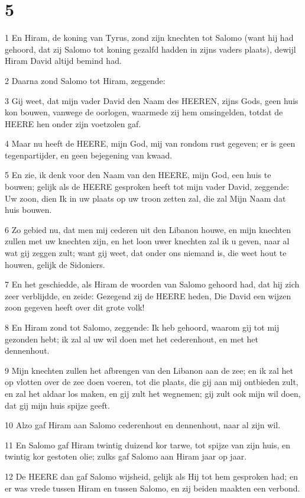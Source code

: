 \chapter{5}

\par 1 En Hiram, de koning van Tyrus, zond zijn knechten tot Salomo (want hij had gehoord, dat zij Salomo tot koning gezalfd hadden in zijns vaders plaats), dewijl Hiram David altijd bemind had.
\par 2 Daarna zond Salomo tot Hiram, zeggende:
\par 3 Gij weet, dat mijn vader David den Naam des HEEREN, zijns Gods, geen huis kon bouwen, vanwege de oorlogen, waarmede zij hem omsingelden, totdat de HEERE hen onder zijn voetzolen gaf.
\par 4 Maar nu heeft de HEERE, mijn God, mij van rondom rust gegeven; er is geen tegenpartijder, en geen bejegening van kwaad.
\par 5 En zie, ik denk voor den Naam van den HEERE, mijn God, een huis te bouwen; gelijk als de HEERE gesproken heeft tot mijn vader David, zeggende: Uw zoon, dien Ik in uw plaats op uw troon zetten zal, die zal Mijn Naam dat huis bouwen.
\par 6 Zo gebied nu, dat men mij cederen uit den Libanon houwe, en mijn knechten zullen met uw knechten zijn, en het loon uwer knechten zal ik u geven, naar al wat gij zeggen zult; want gij weet, dat onder ons niemand is, die weet hout te houwen, gelijk de Sidoniers.
\par 7 En het geschiedde, als Hiram de woorden van Salomo gehoord had, dat hij zich zeer verblijdde, en zeide: Gezegend zij de HEERE heden, Die David een wijzen zoon gegeven heeft over dit grote volk!
\par 8 En Hiram zond tot Salomo, zeggende: Ik heb gehoord, waarom gij tot mij gezonden hebt; ik zal al uw wil doen met het cederenhout, en met het dennenhout.
\par 9 Mijn knechten zullen het afbrengen van den Libanon aan de zee; en ik zal het op vlotten over de zee doen voeren, tot die plaats, die gij aan mij ontbieden zult, en zal het aldaar los maken, en gij zult het wegnemen; gij zult ook mijn wil doen, dat gij mijn huis spijze geeft.
\par 10 Alzo gaf Hiram aan Salomo cederenhout en dennenhout, naar al zijn wil.
\par 11 En Salomo gaf Hiram twintig duizend kor tarwe, tot spijze van zijn huis, en twintig kor gestoten olie; zulks gaf Salomo aan Hiram jaar op jaar.
\par 12 De HEERE dan gaf Salomo wijsheid, gelijk als Hij tot hem gesproken had; en er was vrede tussen Hiram en tussen Salomo, en zij beiden maakten een verbond.
